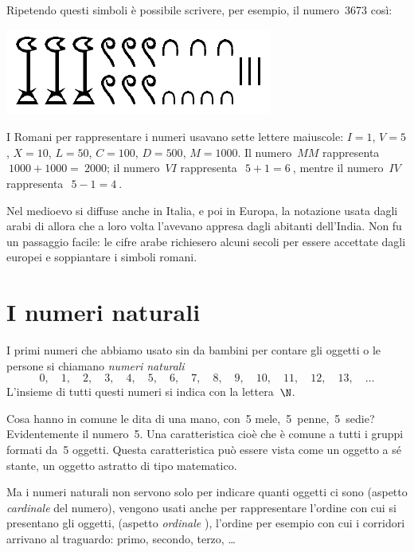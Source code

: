 \vspace{-2ex}
Ripetendo questi simboli è possibile scrivere, per esempio, il numero~3673 
così:

\vspace{-2ex}
{\includegraphics{img/hiero3673.png}}
\vspace{-2ex}

I Romani per rappresentare i numeri usavano sette lettere maiuscole: 
\(I=1\), \(V=5\), \(X=10\), \(L=50\), \(C=100\), \(D=500\), 
\(M=1000\).
Il numero~\(MM\) rappresenta~\(~1000+1000 =~2000\); il numero~\( VI\) 
rappresenta~\(~5+1=6~\), mentre il numero~\( IV~\) rappresenta~\(~5-1=4~\).

Nel medioevo si diffuse anche in Italia, e poi in Europa, la notazione 
usata dagli arabi di allora che a loro volta l'avevano appresa dagli 
abitanti dell'India. 
Non fu un passaggio facile: le cifre arabe richiesero alcuni secoli per 
essere accettate dagli europei e soppiantare i simboli romani.

\section{I numeri naturali}
\label{sec:nat_naturali}

I primi numeri che abbiamo usato sin da bambini per contare gli oggetti o 
le persone si chiamano \emph{numeri naturali}
\[0,\quad 1,\quad 2,\quad 3,\quad 4,\quad 5,\quad 6,\quad 7,\quad 8,\quad 
  9,\quad 10,\quad 11,\quad 12,\quad 13,\quad \dots\]
L'insieme di tutti questi numeri si indica con la lettera~\(\N\).

Cosa hanno in comune le dita di una mano, con~5 mele,~5~penne,~5~sedie? 
Evidentemente il numero~5. Una caratteristica cioè che è comune a tutti i 
gruppi formati da~5 oggetti. 
Questa caratteristica può essere vista come un oggetto a sé stante, 
un oggetto astratto di tipo matematico.

Ma i numeri naturali non servono solo per indicare quanti oggetti ci sono 
(aspetto \emph{cardinale}  del numero), vengono usati 
anche per rappresentare 
l'ordine con cui si presentano gli oggetti, (aspetto \emph{ordinale} 
), 
l'ordine per esempio con cui i corridori arrivano al traguardo: primo, 
secondo, terzo, \ldots


